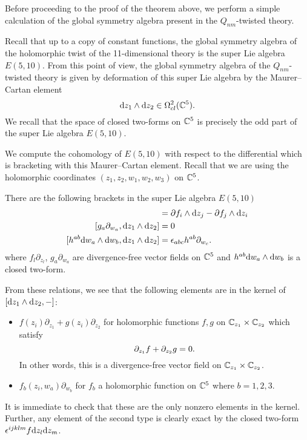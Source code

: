 Before proceeding to the proof of the theorem above, we perform a simple calculation of the global symmetry algebra present in the $Q_{nm}$-twisted theory. 

Recall that up to a copy of constant functions, the global symmetry algebra of the holomorphic twist of the 11-dimensional theory is the super Lie algebra $E(5,10)$.
From this point of view, the global symmetry algebra of the $Q_{nm}$-twisted theory is given by deformation of this super Lie algebra by the Maurer--Cartan element 
\[
{\rm d} z_1 \wedge {\rm d} z_2 \in \Omega^{2}_{cl}(\mathbb C^5) .
\]
We recall that the space of closed two-forms on $\mathbb C^5$ is precisely the odd part of the super Lie algebra $E(5,10)$. 

We compute the cohomology of $E(5,10)$ with respect to the differential which is bracketing with this Maurer--Cartan element. 
Recall that we are using the holomorphic coordinates $(z_1,z_2,w_1,w_2,w_3)$ on $\mathbb C^5$. 

There are the following brackets in the super Lie algebra $E(5,10)$ 
\begin{align*}
[f_l \partial_{z_l} , \d z_1 \wedge \d z_2] & = \del f_i \wedge \d z_j - \del f_j \wedge \d z_i \\
[g_a \partial_{w_a} , \d z_1 \wedge \d z_2] & = 0 \\
[h^{ab} \d w_a \wedge \d w_b , \d z_1 \wedge \d z_2 ] & = \ep_{abc} h^{ab} \partial_{w_c} .
\end{align*}
where $f_l \partial_{z_l}$, $g_a \partial_{w_a}$ are divergence-free vector fields on $\mathbb C^5$ and $h^{ab} {\rm d} w_a \wedge {\rm d} w_b$ is a closed two-form. 

From these relations, we see that the following elements are in the kernel of $[{\rm d} z_1 \wedge {\rm d} z_2, -]$:
\begin{itemize}
\item $f(z_i) \partial_{z_1} + g(z_i) \partial_{z_2}$ for holomorphic functions $f,g$ on $\mathbb C_{z_1} \times \mathbb C_{z_2}$ which satisfy 
\[
\partial_{z_1} f + \partial_{z_2} g = 0 .
\]
In other words, this is a divergence-free vector field on $\mathbb C_{z_1} \times \mathbb C_{z_2}$. 
\item $f_b(z_i, w_a) \partial_{w_b}$ for $f_b$ a holomorphic function on $\mathbb C^5$ where $b=1,2,3$. 
\end{itemize}
It is immediate to check that these are the only nonzero elements in the kernel. 
Further, any element of the second type is clearly exact by the closed two-form $\epsilon^{ijklm} f {\rm d} z_l {\rm d} z_m$. 

